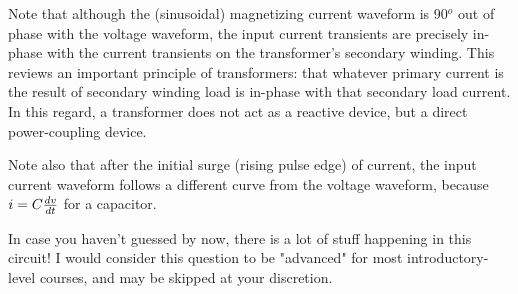 Note that although the (sinusoidal) magnetizing current waveform is 90$^{o}$ out of phase with the voltage waveform, the input current transients are precisely in-phase with the current transients on the transformer's secondary winding.  This reviews an important principle of transformers: that whatever primary current is the result of secondary winding load is in-phase with that secondary load current.  In this regard, a transformer does not act as a reactive device, but a direct power-coupling device.

Note also that after the initial surge (rising pulse edge) of current, the input current waveform follows a different curve from the voltage waveform, because $i = C{dv \over dt}$ for a capacitor.

\vskip 10pt

In case you haven't guessed by now, there is a lot of stuff happening in this circuit!  I would consider this question to be "advanced" for most introductory-level courses, and may be skipped at your discretion.




